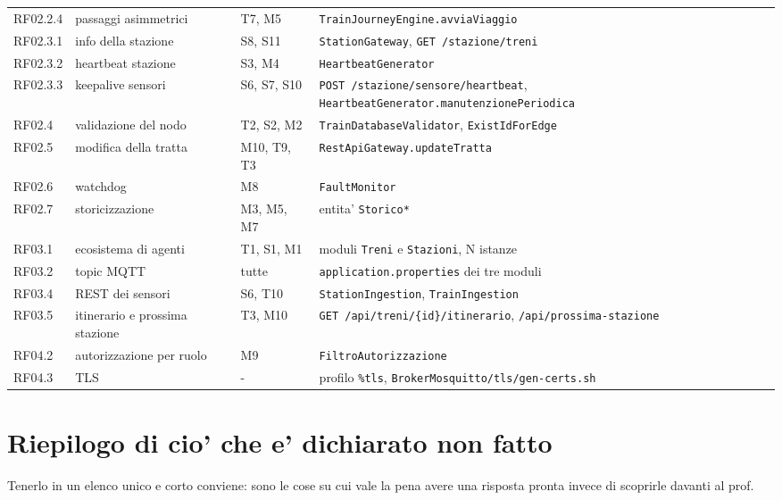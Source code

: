 \documentclass[11pt]{article}
\begin{document}
\begin{center}
\begin{tabular}{llll}
RF02.2.4 & passaggi asimmetrici & T7, M5 & \texttt{TrainJourneyEngine.avviaViaggio}\\
RF02.3.1 & info della stazione & S8, S11 & \texttt{StationGateway}, \texttt{GET /stazione/treni}\\
RF02.3.2 & heartbeat stazione & S3, M4 & \texttt{HeartbeatGenerator}\\
RF02.3.3 & keepalive sensori & S6, S7, S10 & \texttt{POST /stazione/sensore/heartbeat}, \texttt{HeartbeatGenerator.manutenzionePeriodica}\\
RF02.4 & validazione del nodo & T2, S2, M2 & \texttt{TrainDatabaseValidator}, \texttt{ExistIdForEdge}\\
RF02.5 & modifica della tratta & M10, T9, T3 & \texttt{RestApiGateway.updateTratta}\\
RF02.6 & watchdog & M8 & \texttt{FaultMonitor}\\
RF02.7 & storicizzazione & M3, M5, M7 & entita' \texttt{Storico*}\\
RF03.1 & ecosistema di agenti & T1, S1, M1 & moduli \texttt{Treni} e \texttt{Stazioni}, N istanze\\
RF03.2 & topic MQTT & tutte & \texttt{application.properties} dei tre moduli\\
RF03.4 & REST dei sensori & S6, T10 & \texttt{StationIngestion}, \texttt{TrainIngestion}\\
RF03.5 & itinerario e prossima stazione & T3, M10 & \texttt{GET /api/treni/\{id\}/itinerario}, \texttt{/api/prossima-stazione}\\
RF04.2 & autorizzazione per ruolo & M9 & \texttt{FiltroAutorizzazione}\\
RF04.3 & TLS & - & profilo \texttt{\%tls}, \texttt{BrokerMosquitto/tls/gen-certs.sh}\\
\end{tabular}
\end{center}
\section{Riepilogo di cio' che e' dichiarato non fatto}
\label{sec:orgb38aa1e}

Tenerlo in un elenco unico e corto conviene: sono le cose su cui vale la pena avere una risposta
pronta invece di scoprirle davanti al prof.
\end{document}

